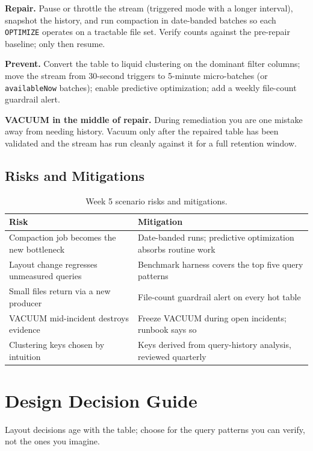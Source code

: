 \textbf{Repair.} Pause or throttle the stream (triggered mode with a longer interval), snapshot the history, and run compaction in date-banded batches so each \texttt{OPTIMIZE} operates on a tractable file set. Verify counts against the pre-repair baseline; only then resume.

\textbf{Prevent.} Convert the table to liquid clustering on the dominant filter columns; move the stream from 30-second triggers to 5-minute micro-batches (or \texttt{availableNow} batches); enable predictive optimization; add a weekly file-count guardrail alert.

\begin{pitfall}
\textbf{VACUUM in the middle of repair.} During remediation you are one mistake away from needing history. Vacuum only after the repaired table has been validated and the stream has run cleanly against it for a full retention window.
\end{pitfall}

\subsection{Risks and Mitigations}
\begin{table}[H]
\centering
\small
\begin{tabular}{@{}p{4.6cm}p{7.6cm}@{}}
\toprule
\textbf{Risk} & \textbf{Mitigation} \\
\midrule
Compaction job becomes the new bottleneck & Date-banded runs; predictive optimization absorbs routine work \\
Layout change regresses unmeasured queries & Benchmark harness covers the top five query patterns \\
Small files return via a new producer & File-count guardrail alert on every hot table \\
VACUUM mid-incident destroys evidence & Freeze VACUUM during open incidents; runbook says so \\
Clustering keys chosen by intuition & Keys derived from query-history analysis, reviewed quarterly \\
\bottomrule
\end{tabular}
\caption{Week 5 scenario risks and mitigations.}
\label{tab:ch5-risks}
\end{table}

\section{Design Decision Guide}
%
Layout decisions age with the table; choose for the query patterns you can verify, not the ones you imagine.

